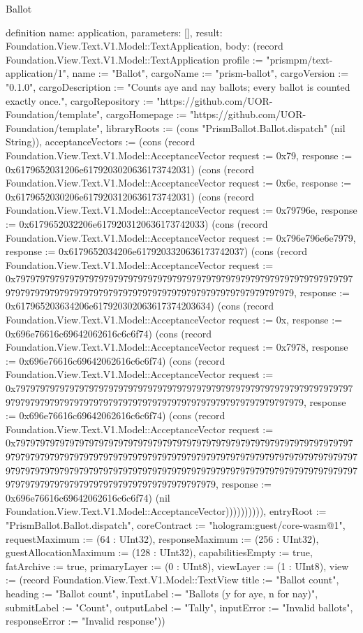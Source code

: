 \begin{lexlean}{Ballot}
\begin{semanticmodule}
definition{
  name: application,
  parameters: [],
  result: Foundation.View.Text.V1.Model::TextApplication,
  body: (record Foundation.View.Text.V1.Model::TextApplication {profile := "prismpm/text-application/1", name := "Ballot", cargoName := "prism-ballot", cargoVersion := "0.1.0", cargoDescription := "Counts aye and nay ballots; every ballot is counted exactly once.", cargoRepository := "https://github.com/UOR-Foundation/template", cargoHomepage := "https://github.com/UOR-Foundation/template", libraryRoots := (cons "PrismBallot.Ballot.dispatch" (nil String)), acceptanceVectors := (cons (record Foundation.View.Text.V1.Model::AcceptanceVector {request := 0x79, response := 0x6179652031206e6179203020636173742031}) (cons (record Foundation.View.Text.V1.Model::AcceptanceVector {request := 0x6e, response := 0x6179652030206e6179203120636173742031}) (cons (record Foundation.View.Text.V1.Model::AcceptanceVector {request := 0x79796e, response := 0x6179652032206e6179203120636173742033}) (cons (record Foundation.View.Text.V1.Model::AcceptanceVector {request := 0x796e796e6e7979, response := 0x6179652034206e6179203320636173742037}) (cons (record Foundation.View.Text.V1.Model::AcceptanceVector {request := 0x79797979797979797979797979797979797979797979797979797979797979797979797979797979797979797979797979797979797979797979797979797979, response := 0x617965203634206e617920302063617374203634}) (cons (record Foundation.View.Text.V1.Model::AcceptanceVector {request := 0x, response := 0x696e76616c69642062616c6c6f74}) (cons (record Foundation.View.Text.V1.Model::AcceptanceVector {request := 0x7978, response := 0x696e76616c69642062616c6c6f74}) (cons (record Foundation.View.Text.V1.Model::AcceptanceVector {request := 0x7979797979797979797979797979797979797979797979797979797979797979797979797979797979797979797979797979797979797979797979797979797979, response := 0x696e76616c69642062616c6c6f74}) (cons (record Foundation.View.Text.V1.Model::AcceptanceVector {request := 0x7979797979797979797979797979797979797979797979797979797979797979797979797979797979797979797979797979797979797979797979797979797979797979797979797979797979797979797979797979797979797979797979797979797979797979797979797979797979797979797979797979797979797979, response := 0x696e76616c69642062616c6c6f74}) (nil Foundation.View.Text.V1.Model::AcceptanceVector)))))))))), entryRoot := "PrismBallot.Ballot.dispatch", coreContract := "hologram:guest/core-wasm@1", requestMaximum := (64 : UInt32), responseMaximum := (256 : UInt32), guestAllocationMaximum := (128 : UInt32), capabilitiesEmpty := true, fatArchive := true, primaryLayer := (0 : UInt8), viewLayer := (1 : UInt8), view := (record Foundation.View.Text.V1.Model::TextView {title := "Ballot count", heading := "Ballot count", inputLabel := "Ballots (y for aye, n for nay)", submitLabel := "Count", outputLabel := "Tally", inputError := "Invalid ballots", responseError := "Invalid response"})})
}
\end{semanticmodule}
\end{lexlean}
